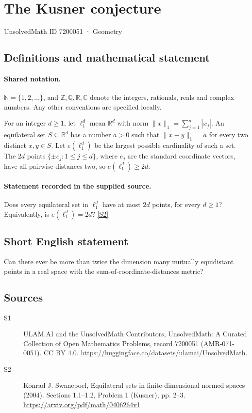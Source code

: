 \documentclass[11pt]{article}
\newcommand{\sref}[2]{\hyperlink{source:#1:#2}{[S#2]}}
\begin{document}
\setcounter{section}{7200050}
\section{The Kusner conjecture}\label{7200051}
{\small\sffamily UnsolvedMath ID 7200051 · Geometry}
\subsection{Definitions and mathematical statement}

\paragraph{Shared notation.}$\mathbb N=\{1,2,\ldots\}$, and $\mathbb Z,\mathbb Q,\mathbb R,\mathbb C$ denote the integers, rationals, reals and complex numbers. Any other conventions are specified locally.


For an integer $d\geq1$, let $\ell_1^d$ mean $\mathbb R^d$ with norm $\|x\|_1=\sum_{j=1}^d|x_j|$. An equilateral set $S\subseteq\mathbb R^d$ has a number $a>0$ such that $\|x-y\|_1=a$ for every two distinct $x,y\in S$. Let $e(\ell_1^d)$ be the largest possible cardinality of such a set. The $2d$ points $\{\pm e_j:1\leq j\leq d\}$, where $e_j$ are the standard coordinate vectors, have all pairwise distances two, so $e(\ell_1^d)\geq2d$.
\paragraph{Statement recorded in the supplied source.}
Does every equilateral set in $\ell_1^d$ have at most $2d$ points, for every $d\geq1$? Equivalently, is $e(\ell_1^d)=2d$? \sref{7200051}{2}
\subsection{Short English statement}
Can there ever be more than twice the dimension many mutually equidistant points in a real space with the sum-of-coordinate-distances metric?
\subsection{Sources}
\begin{description}
\item[\hypertarget{source:7200051:1}{S1}] ULAM.AI and the UnsolvedMath Contributors, UnsolvedMath: A Curated Collection of Open Mathematics Problems, record 7200051 (AMR-071-0051). CC BY 4.0. \url{https://huggingface.co/datasets/ulamai/UnsolvedMath}.
\item[\hypertarget{source:7200051:2}{S2}] Konrad J. Swanepoel, Equilateral sets in finite-dimensional normed spaces (2004). Sections 1.1–1.2, Problem 1 (Kusner), pp. 2–3. \url{https://arxiv.org/pdf/math/0406264v1}.
\end{description}
\label{end:7200051}
\end{document}
